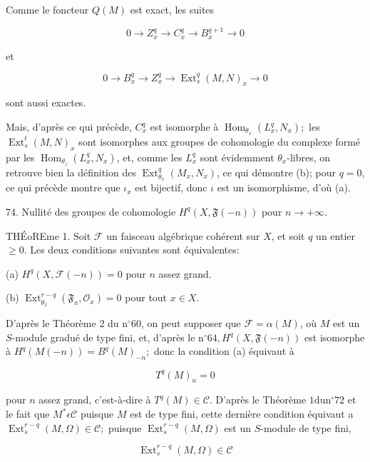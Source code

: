 Comme le foncteur $Q(M)$ est exact, les suites

$$
0 \rightarrow Z_{x}^{q} \rightarrow C_{x}^{q} \rightarrow B_{x}^{q+1} \rightarrow 0
$$

et

$$
0 \rightarrow B_{x}^{q} \rightarrow Z_{x}^{q} \rightarrow \operatorname{Ext}_{s}^{q}(M, N)_{x} \rightarrow 0
$$

sont aussi exactes.

Mais, d'après ce qui précède, $C_{x}^{q}$ est isomorphe à $\operatorname{Hom}_{\theta_{x}}\left(L_{x}^{q}, N_{x}\right) ;$ les $\operatorname{Ext}_{s}^{t}(M, N)_{x}$ sont isomorphes aux groupes de cohomologie du complexe formé par les $\operatorname{Hom}_{\theta_{z}}\left(L_{x}^{q}, N_{x}\right)$, et, comme les $L_{x}^{q}$ sont évidemment $\mathcal{\theta}_{x}$-libres, on retrouve bien la définition des $\operatorname{Ext}_{\theta_{x}}^{q}\left(M_{x}, N_{x}\right)$, ce qui démontre (b); pour $q=0$, ce qui précède montre que $\iota_{x}$ est bijectif, donc $\iota$ est un isomorphisme, d'où (a).

74. Nullité des groupes de cohomologie $H^{q}(X, \mathfrak{F}(-n))$ pour $n \rightarrow+\infty$.

THÉoREme 1. Soit $\mathcal{F}$ un faisceau algébrique cohérent sur $X$, et soit $q$ un entier $\geq 0$. Les deux conditions suivantes sont équivalentes:

(a) $H^{q}(X, \mathcal{F}(-n))=0$ pour $n$ assez grand.

(b) $\operatorname{Ext}_{\theta_{x}}^{r-q}\left(\mathfrak{F}_{x}, \mathcal{O}_{x}\right)=0$ pour tout $x \in X$.

D'après le Théorème 2 du $\mathrm{n}^{\circ} 60$, on peut supposer que $\mathcal{F}=\alpha(M)$, où $M$ est un $S$-module gradué de type fini, et, d'après le $\mathrm{n}^{\circ} 64, H^{q}(X, \mathfrak{F}(-n))$ est isomorphe à $H^{q}(M(-n))=B^{q}(M)_{-n} ;$ donc la condition (a) équivaut à

$$
T^{q}(M)_{n}=0
$$

pour $n$ assez grand, c'est-à-dire à $T^{q}(M) \in \mathcal{C} .$ D'après le Théorème $1 \mathrm{du} \mathrm{n}^{\circ} 72$ et le fait que $M^{*} \epsilon \mathcal{C}$ puisque $M$ est de type fini, cette dernière condition équivaut a $\operatorname{Ext}_{s}^{r-q}(M, \Omega) \in \mathcal{C} ;$ puisque $\operatorname{Ext}_{s}^{r-q}(M, \Omega)$ est un $S$-module de type fini,

$$
\operatorname{Ext}_{s}^{r-q}(M, \Omega) \in \mathcal{C}
$$

